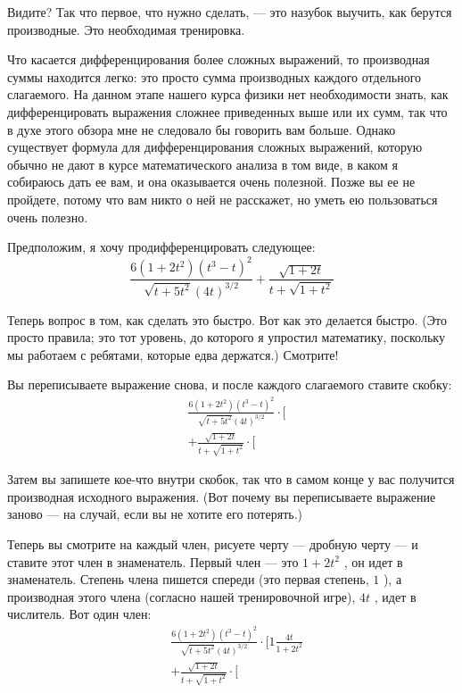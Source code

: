 \documentclass[11pt,oneside]{article}
\begin{document}
Видите? Так что первое, что нужно сделать, --- это назубок выучить, как берутся производные. Это необходимая тренировка.\par

Что касается дифференцирования более сложных выражений, то производная суммы находится легко: это просто сумма производных каждого отдельного слагаемого. На данном этапе нашего курса физики нет необходимости знать, как дифференцировать выражения сложнее приведенных выше или их сумм, так что в духе этого обзора мне не следовало бы говорить вам больше. Однако существует формула для дифференцирования сложных выражений, которую обычно не дают в курсе математического анализа в том виде, в каком я собираюсь дать ее вам, и она оказывается очень полезной. Позже вы ее не пройдете, потому что вам никто о ней не расскажет, но уметь ею пользоваться очень полезно.\par

Предположим, я хочу продифференцировать следующее: 
\begin{equation*} \tag{1.3}
\label{Eq:TIPS:1:3} \frac{6(1+2t^2)(t^3-t)^2}{\sqrt{t+5t^2}(4t)^{3/2}} + \frac{\sqrt{1+2t}}{t+\sqrt{1+t^2}} \end{equation*}
\par

Теперь вопрос в том, как сделать это быстро. Вот как это делается быстро. (Это просто правила; это тот уровень, до которого я упростил математику, поскольку мы работаем с ребятами, которые едва держатся.) Смотрите!\par

Вы переписываете выражение снова, и после каждого слагаемого ставите скобку: 
\begin{equation*} \begin{aligned} &\frac{6(1+2t^2)(t^3-t)^2}{\sqrt{t+5t^2}(4t)^{3/2}}\cdot\Bigg[\\[.5ex] &+\frac{\sqrt{1+2t}}{t+\sqrt{1+t^2}}\cdot\Bigg[ \end{aligned} \tag{1.4}
\label{Eq:TIPS:1:4} \end{equation*}
\par

Затем вы запишете кое-что внутри скобок, так что в самом конце у вас получится производная исходного выражения. (Вот почему вы переписываете выражение заново --- на случай, если вы не хотите его потерять.)\par

Теперь вы смотрите на каждый член, рисуете черту --- дробную черту --- и ставите этот член в знаменатель. Первый член --- это \(1+2t^2\) , он идет в знаменатель. Степень члена пишется спереди (это первая степень, \(1\) ), а производная этого члена (согласно нашей тренировочной игре), \(4t\) , идет в числитель. Вот один член: 
\begin{equation*} \begin{aligned} &\frac{6(1+2t^2)(t^3-t)^2}{\sqrt{t+5t^2}(4t)^{3/2}}\cdot\Bigg[1\frac{4t}{1+2t^2}\\[.5ex] &+\frac{\sqrt{1+2t}}{t+\sqrt{1+t^2}}\cdot\Bigg[ \end{aligned} \tag{1.5}
\label{Eq:TIPS:1:5} \end{equation*}
\par
\end{document}

